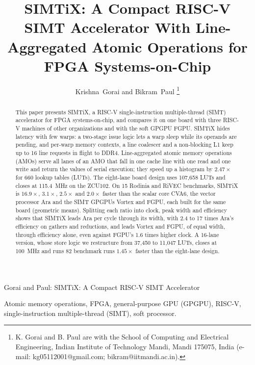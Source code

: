 \documentclass[journal]{IEEEtran}
\begin{document}
\title{SIMTiX: A Compact RISC-V SIMT Accelerator With Line-Aggregated Atomic
Operations for FPGA Systems-on-Chip}

\author{Krishna~Gorai and Bikram~Paul%
\thanks{K. Gorai and B. Paul are with the School of Computing and Electrical
Engineering, Indian Institute of Technology Mandi, Mandi 175075, India (e-mail:
kg05112001@gmail.com; bikram@iitmandi.ac.in).}}

%
{Gorai and Paul: SIMTiX: A Compact RISC-V SIMT Accelerator}

\maketitle

\begin{abstract}
This paper presents SIMTiX, a RISC-V single-instruction multiple-thread (SIMT)
accelerator for FPGA systems-on-chip, and compares it on one board with three RISC-V
machines of other organizations and with the soft GPGPU FGPU. SIMTiX hides latency with
few warps: a two-stage
issue logic lets a warp sleep while its operands are pending, and per-warp memory
contexts, a line coalescer and a non-blocking L1 keep up to 16 line requests in flight
to DDR4. Line-aggregated atomic memory operations (AMOs)
serve all lanes of an AMO that fall in one cache line with one read and one write and
return the values of serial execution; they speed up a histogram by $2.47\times$ for
660 lookup tables (LUTs). The eight-lane board design uses 107,658 LUTs and closes at
115.4~MHz on the ZCU102. On 15 Rodinia and RiVEC benchmarks, SIMTiX is $16.9\times$,
$3.1\times$, $2.5\times$ and $2.0\times$ faster than the scalar core CVA6, the vector
processor Ara and the SIMT GPGPUs Vortex and FGPU, each built for the same board
(geometric means). Splitting each ratio into clock, peak width and efficiency shows that
SIMTiX leads Ara per cycle through its width, with 2.4 to 17 times Ara's efficiency on
gathers and reductions, and leads Vortex and FGPU, of equal width, through efficiency
alone, even against FGPU's 1.6 times higher clock. A 16-lane version, whose
store logic we restructure from 37,450 to 11,047 LUTs, closes at 100~MHz and runs 82
benchmark runs $1.45\times$ faster than the eight-lane design.
\end{abstract}

\begin{IEEEkeywords}
Atomic memory operations, FPGA, general-purpose GPU (GPGPU), RISC-V,
single-instruction multiple-thread (SIMT), soft processor.
\end{IEEEkeywords}
\end{document}
